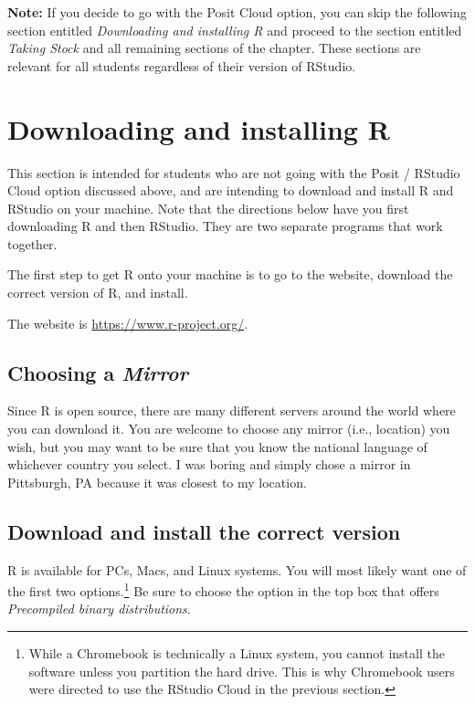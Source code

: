 \documentclass[
]{book}
\begin{document}
\textbf{Note:} If you decide to go with the Posit Cloud option, you can skip the following section entitled \emph{Downloading and installing R} and proceed to the section entitled \emph{Taking Stock} and all remaining sections of the chapter. These sections are relevant for all students regardless of their version of RStudio.

\section{Downloading and installing R}\label{downloading-and-installing-r}

This section is intended for students who are not going with the Posit / RStudio Cloud option discussed above, and are intending to download and install R and RStudio on your machine. Note that the directions below have you first downloading R and then RStudio. They are two separate programs that work together.

The first step to get R onto your machine is to go to the website, download the correct version of R, and install.

The website is \url{https://www.r-project.org/}.

\subsection{\texorpdfstring{Choosing a \emph{Mirror}}{Choosing a Mirror}}\label{choosing-a-mirror}

Since R is open source, there are many different servers around the world where you can download it. You are welcome to choose any mirror (i.e., location) you wish, but you may want to be sure that you know the national language of whichever country you select. I was boring and simply chose a mirror in Pittsburgh, PA because it was closest to my location.

\subsection{Download and install the correct version}\label{download-and-install-the-correct-version}

R is available for PCs, Macs, and Linux systems. You will most likely want one of the first two options.\footnote{While a Chromebook is technically a Linux system, you cannot install the software unless you partition the hard drive. This is why Chromebook users were directed to use the RStudio Cloud in the previous section.} Be sure to choose the option in the top box that offers \emph{Precompiled binary distributions}.
\end{document}
